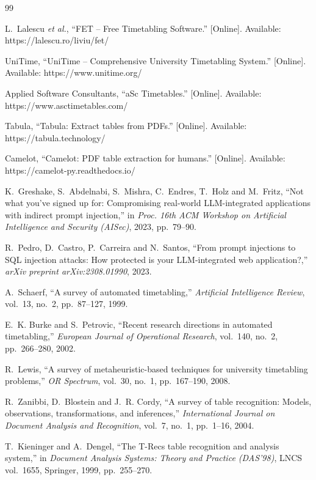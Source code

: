 \begin{thebibliography}{99}

L.~Lalescu \emph{et al.}, ``FET -- Free Timetabling Software.'' [Online]. Available:
https://lalescu.ro/liviu/fet/

UniTime, ``UniTime -- Comprehensive University Timetabling System.'' [Online]. Available:
https://www.unitime.org/

Applied Software Consultants, ``aSc Timetables.'' [Online]. Available: https://www.asctimetables.com/

Tabula, ``Tabula: Extract tables from PDFs.'' [Online]. Available: https://tabula.technology/

Camelot, ``Camelot: PDF table extraction for humans.'' [Online]. Available:
https://camelot-py.readthedocs.io/

K.~Greshake, S.~Abdelnabi, S.~Mishra, C.~Endres, T.~Holz and M.~Fritz, ``Not what you've signed up
for: Compromising real-world LLM-integrated applications with indirect prompt injection,'' in
\emph{Proc. 16th ACM Workshop on Artificial Intelligence and Security (AISec)}, 2023, pp.~79--90.

R.~Pedro, D.~Castro, P.~Carreira and N.~Santos, ``From prompt injections to SQL injection attacks:
How protected is your LLM-integrated web application?,'' \emph{arXiv preprint arXiv:2308.01990}, 2023.

A.~Schaerf, ``A survey of automated timetabling,'' \emph{Artificial Intelligence Review}, vol.~13,
no.~2, pp.~87--127, 1999.

E.~K. Burke and S.~Petrovic, ``Recent research directions in automated timetabling,''
\emph{European Journal of Operational Research}, vol.~140, no.~2, pp.~266--280, 2002.

R.~Lewis, ``A survey of metaheuristic-based techniques for university timetabling problems,''
\emph{OR Spectrum}, vol.~30, no.~1, pp.~167--190, 2008.

R.~Zanibbi, D.~Blostein and J.~R. Cordy, ``A survey of table recognition: Models, observations,
transformations, and inferences,'' \emph{International Journal on Document Analysis and Recognition},
vol.~7, no.~1, pp.~1--16, 2004.

T.~Kieninger and A.~Dengel, ``The T-Recs table recognition and analysis system,'' in
\emph{Document Analysis Systems: Theory and Practice (DAS'98)}, LNCS vol.~1655, Springer, 1999,
pp.~255--270.


\end{thebibliography}
